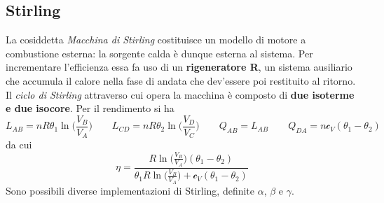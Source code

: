 \documentclass[10pt, oneside]{book}
\newcommand{\molhtv}{\mathcal{c}_V }
\begin{document}
\subsection{Stirling}
La cosiddetta \textit{Macchina di Stirling} costituisce un modello di motore a combustione esterna: la sorgente calda è dunque esterna al sistema. Per incrementare l'efficienza essa fa uso di un \textbf{rigeneratore R}, un sistema ausiliario che accumula il calore nella fase di andata che dev'essere poi restituito al ritorno.\\Il \textit{ciclo di Stirling} attraverso cui opera la macchina è composto di \textbf{due isoterme e due isocore}.
Per il rendimento si ha
\[L_{AB} = nR \theta_1 \ln \bigg( \frac{V_B}{V_A} \bigg) \qquad L_{CD} =nR \theta_2 \ln \bigg( \frac{V_D}{V_C} \bigg) \qquad Q_{AB} = L_{AB} \qquad Q_{DA} = n \molhtv (\theta_1 - \theta_2) \]
da cui
\[\eta = \frac{R \ln \bigg(\displaystyle \frac{V_B}{V_A}\bigg) (\theta_1 - \theta_2)}{\displaystyle \theta_1 R\ln \bigg(\frac{V_B}{V_A}\bigg) + \mathcal{c}_V(\theta_1 - \theta_2)} \]
Sono possibili diverse implementazioni di Stirling, definite $\alpha$, $\beta$ e $\gamma$.
\end{document}
